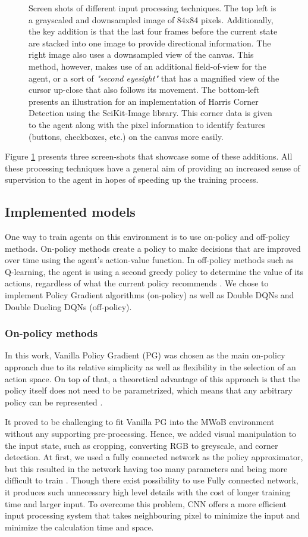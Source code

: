 \documentclass[10pt,journal,compsoc]{IEEEtran}
\begin{document}
\begin{figure}[h!]
	\caption{Screen shots of different input processing techniques. The top left is a grayscaled and downsampled image of 84x84 pixels. Additionally, the key addition is that the last four frames before the current state are stacked into one image to provide directional information. The right image also uses a downsampled view of the canvas. This method, however, makes use of an additional field-of-view for the agent, or a sort of \textit{"second eyesight"} that has a magnified view of the cursor up-close that also follows its movement. The bottom-left presents an illustration for an implementation of Harris Corner Detection using the SciKit-Image library. This corner data is given to the agent along with the pixel information to identify features (buttons, checkboxes, etc.) on the canvas more easily.}
	\label{fig:inputprocessing}
\end{figure}

Figure \ref{fig:inputprocessing} presents three screen-shots that showcase some of these additions.  All these processing techniques have a general aim of providing an increased sense of supervision to the agent in hopes of speeding up the training process.

\subsection{Implemented models}
One way to train agents on this environment is to use on-policy and off-policy methods. On-policy methods create a policy to make decisions that are improved over time using the agent's action-value function. In off-policy methods such as Q-learning, the agent is using a second greedy policy to determine the value of its actions, regardless of what the current policy recommends \cite{sutton1998reinforcement}. We chose to implement Policy Gradient algorithms (on-policy) as well as Double DQNs and Double Dueling DQNs (off-policy).
\subsubsection{On-policy methods}  
In this work, Vanilla Policy Gradient (PG) was chosen as the main on-policy approach due to its relative simplicity as well as flexibility in the selection of an action space.
On top of that, a theoretical advantage of this approach is that the policy itself does not need to be parametrized, which means that any arbitrary policy can be represented \cite{Peters:2010}.

It proved to be challenging to fit Vanilla PG into the MWoB environment without any supporting pre-processing. Hence, we added visual manipulation to the input state, such as cropping, converting RGB to greyscale, and corner detection. At first, we used a fully connected network as the policy approximator, but this resulted in the network having too many parameters and being more difficult to train \cite{LongSD14}. Though there exist possibility to use Fully connected network, it produces such unnecessary high level details with the cost of longer training time and larger input. To overcome this problem, CNN offers a more efficient input processing system that takes neighbouring pixel to minimize the input and minimize the calculation time and space. 
\end{document}
